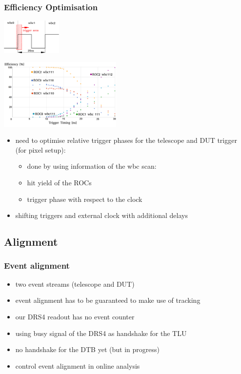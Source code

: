 \documentclass[9pt]{beamer}
\begin{document}
\begin{frame}
	\frametitle{Efficiency Optimisation}
	\begin{center}
		\begin{minipage}{3cm}
			\centering
			\includegraphics[width=3cm]{ClockCycle}
		\end{minipage}
		\begin{minipage}{8cm}
			\centering
			\includegraphics[height=3.5cm]{Pics/optimisation}
		\end{minipage}
	\end{center}
	\begin{itemize}
		\setlength{\itemsep}{\fill}
		\item need to optimise relative trigger phases for the telescope and DUT trigger (for pixel setup):
			\begin{itemize}
				\item done by using information of the wbc scan:
				\item hit yield of the ROCs
				\item trigger phase with respect to the clock
			\end{itemize}
		\item shifting triggers and external clock with additional delays
	\end{itemize}
\end{frame}
\subsection{Alignment}
\begin{frame}
	\frametitle{Event alignment}
	\begin{itemize}
		\setlength{\itemsep}{\fill}
		\item two event streams (telescope and DUT)
		\item event alignment has to be guaranteed to make use of tracking
		\item our DRS4 readout has no event counter
		\item using busy signal of the DRS4 as handshake for the TLU
		\item no handshake for the DTB yet (but in progress)
		\item control event alignment in online analysis
	\end{itemize}
\end{frame}
\end{document}
